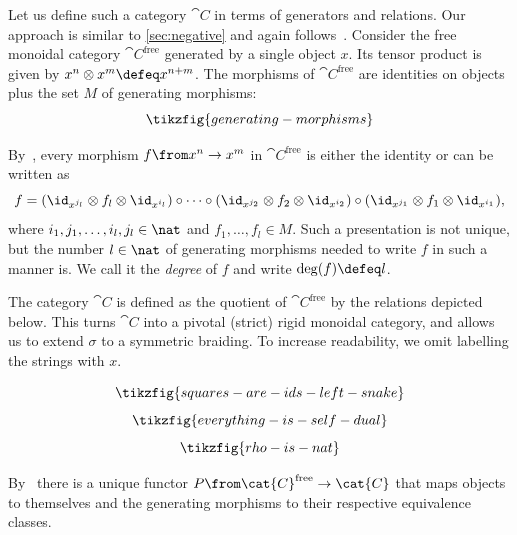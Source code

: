 Let us define such a category \(\cat{C}\) in terms of generators and relations.
Our approach is similar to \cref{sec:negative} and again follows~\cite[Chapter~\textsc{xii}]{Kassel1998}.
Consider the free monoidal category \(\cat{C}^{\text{free}}\)
generated by a single object \(x\).
Its tensor product is given by \(x^n\otimes x^m \defeq x^{n+m}\).
The morphisms of \(\cat{C}^{\text{free}}\) are identities on objects plus the set \(M\) of generating morphisms:
\[
  \tikzfig{generating-morphisms}
\]

\begin{remark}
  By~\cite[Lemma~\textsc{xii}.1.2]{Kassel1998},
  every morphism \(f \from x^n \to x^m\) in \(\cat{C}^{\text{free}}\) is either the identity or can be written as
  \[
    f = (\id_{x^{j_l}}\otimes f_l \otimes \id_{x^{i_l}})
    \circ \dots \circ (\id_{x^{j_2}}\otimes f_2 \otimes \id_{x^{i_2}})
    \circ (\id_{x^{j_1}}\otimes f_1 \otimes \id_{x^{i_1}}),
  \]
  where \(i_1,j_1, \dots, i_l,j_l \in \nat\) and \(f_1, \dots, f_l \in M\).
  Such a presentation is not unique,
  but the number \(l \in \nat\) of generating morphisms needed to write \(f\) in such a manner is.
  We call it the \emph{degree} of \(f\) and write \(\deg(f) \defeq l\).
\end{remark}

\begin{definition}\label{def:thecthatwedefine}
  The category \(\cat{C}\) is defined as the quotient of \(\cat{C}^{\text{free}}\) by the relations depicted below.
  This turns \(\cat{C}\) into a pivotal (strict) rigid monoidal category,
  and allows us to extend \(\sigma\) to a symmetric braiding.
  To increase readability, we omit labelling the strings with \(x\).

  \begin{equation}\label{eq:squares-are-ids-left-snake}
    \tikzfig{squares-are-ids-left-snake}
  \end{equation}
  \begin{equation}\label{eq:everything-is-self-dual}
    \tikzfig{everything-is-self-dual}
  \end{equation}
  \begin{equation}\label{eq:rho-is-nat}
    \tikzfig{rho-is-nat}
  \end{equation}
\end{definition}

By~\cite[Proposition~\textsc{xii}.1.4]{Kassel1998} there is a unique functor
\(P \from \cat{C}^{\text{free}}\to \cat{C}\)
that maps objects to themselves and the generating morphisms to their respective equivalence classes.

